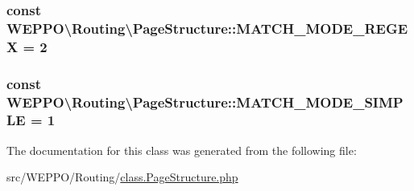 \subsubsection[{\texorpdfstring{M\+A\+T\+C\+H\+\_\+\+M\+O\+D\+E\+\_\+\+R\+E\+G\+EX}{MATCH_MODE_REGEX}}]{\setlength{\rightskip}{0pt plus 5cm}const W\+E\+P\+P\+O\textbackslash{}\+Routing\textbackslash{}\+Page\+Structure\+::\+M\+A\+T\+C\+H\+\_\+\+M\+O\+D\+E\+\_\+\+R\+E\+G\+EX = 2}\hypertarget{classWEPPO_1_1Routing_1_1PageStructure_a1ebae2430cd701d5b5c877b3c5b6c5f0}{}\label{classWEPPO_1_1Routing_1_1PageStructure_a1ebae2430cd701d5b5c877b3c5b6c5f0}
\subsubsection[{\texorpdfstring{M\+A\+T\+C\+H\+\_\+\+M\+O\+D\+E\+\_\+\+S\+I\+M\+P\+LE}{MATCH_MODE_SIMPLE}}]{\setlength{\rightskip}{0pt plus 5cm}const W\+E\+P\+P\+O\textbackslash{}\+Routing\textbackslash{}\+Page\+Structure\+::\+M\+A\+T\+C\+H\+\_\+\+M\+O\+D\+E\+\_\+\+S\+I\+M\+P\+LE = 1}\hypertarget{classWEPPO_1_1Routing_1_1PageStructure_a52f371b7de8e41c5e7f78d0ce73ff047}{}\label{classWEPPO_1_1Routing_1_1PageStructure_a52f371b7de8e41c5e7f78d0ce73ff047}


The documentation for this class was generated from the following file\+:\begin{DoxyCompactItemize}
\item 
src/\+W\+E\+P\+P\+O/\+Routing/\hyperlink{class_8PageStructure_8php}{class.\+Page\+Structure.\+php}\end{DoxyCompactItemize}
